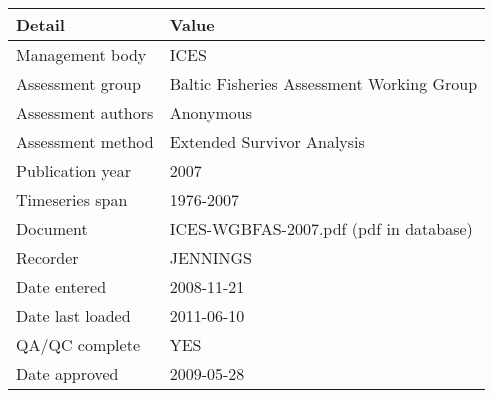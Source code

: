 \begin{table}[htb]
\centering
\begin{tabular}{lp{7cm}}
\toprule
Detail & Value \\
\midrule
Management body    & ICES                                      \\
Assessment group   & Baltic Fisheries Assessment Working Group \\
Assessment authors & Anonymous                                 \\
Assessment method  & Extended Survivor Analysis                \\
Publication year   & 2007                                      \\
Timeseries span    & 1976-2007                                 \\
Document           & ICES-WGBFAS-2007.pdf (pdf in database)    \\
Recorder           & JENNINGS                                  \\
Date entered       & 2008-11-21                                \\
Date last loaded   & 2011-06-10                                \\
QA/QC complete     & YES                                       \\
Date approved      & 2009-05-28                                \\
\bottomrule
\end{tabular}
\label{tab:assessdet}
\end{table}
